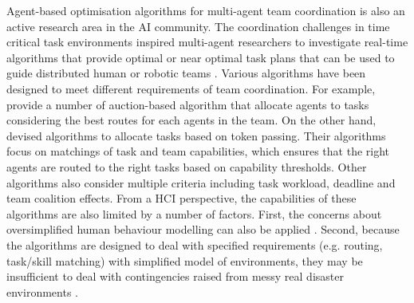 
Agent-based optimisation algorithms for multi-agent team coordination is also an active research area in the \ac{AI} community. The coordination challenges in time critical task environments inspired multi-agent researchers to investigate real-time algorithms that provide optimal or near optimal task plans that can be used to guide distributed human or robotic teams \citep{Kitano2000}. Various algorithms have been designed to meet different requirements of team coordination. For example, \cite{Lagoudakis2005} provide a number of auction-based algorithm that allocate agents to tasks considering the best routes for each agents in the team. On the other hand, \cite{Scerri2005a} devised algorithms to allocate tasks based on token passing. Their algorithms focus on matchings of task and team capabilities, which ensures that the right agents are routed to the right tasks based on capability thresholds. Other algorithms \citep{Ramchurn2010,Koes2005} also consider multiple criteria including task workload, deadline and team coalition effects. From a \ac{HCI} perspective, the capabilities of these algorithms are also limited by a number of factors. First, the concerns about oversimplified human behaviour modelling can also be applied \citep{Drury2009}. Second, because the algorithms are designed to deal with specified requirements (e.g. routing, task/skill matching) with simplified model of environments, they may be insufficient to deal with contingencies raised from messy real disaster environments \citep{Armenakis2012}.\\

